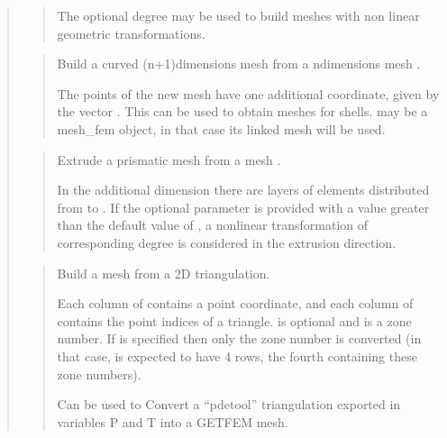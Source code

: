 \documentclass[a4paper,11pt,english]{sphinxmanual}
\begin{document}
\begin{quote}
\begin{quote}
The optional degree may be used to build meshes with non linear
geometric transformations.
\end{quote}

\begin{quote}

Build a curved (n+1)\sphinxhyphen{}dimensions mesh from a n\sphinxhyphen{}dimensions mesh .

The points of the new mesh have one additional coordinate, given by
the vector . This can be used to obtain meshes for shells.  may
be a mesh\_fem object, in that case its linked mesh will be used.
\end{quote}

\begin{quote}

Extrude a prismatic mesh  from a mesh .

In the additional dimension there are  layers of elements
distributed from  to .
If the optional parameter  is provided with a value greater
than the default value of , a non\sphinxhyphen{}linear transformation of
corresponding degree is considered in the extrusion direction.
\end{quote}

\begin{quote}

Build a mesh from a 2D triangulation.

Each column of  contains a point coordinate, and each column of 
contains the point indices of a triangle.  is optional and is a
zone number. If  is specified then only the zone number  is
converted (in that case,  is expected to have 4 rows, the fourth
containing these zone numbers).

Can be used to Convert a “pdetool” triangulation exported in
variables P and T into a GETFEM mesh.
\end{quote}


\end{quote}
\end{document}
